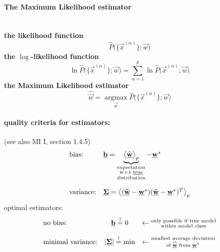 \paragraph{The Maximum Likelihood estimator}\mbox{}\\
\textbf{the likelihood function}\\
\begin{equation*}
        \widehat{P}\big(\big\{\vec{x}^{(\alpha)}\big\}; \vec{w}\big)
\end{equation*}
\textbf{the $\log$-likelihood function}
$$
\ln \widehat{P}\big(\big\{\vec{x}^{(\alpha)}\big\};\vec{w}\big)
= \sum\limits_{\alpha = 1}^p \ln \widehat{P}
                        \big( \vec{x}^{(\alpha)};\vec{w} \big) 
$$
\textbf{the Maximum Likelihood estimator}\\
\begin{equation*}
        \widehat{\vec{w}} = \underset{\vec{w}}{\operatorname{argmax}}\widehat{P}\big(\big\{\vec{x}^{(\alpha)}\big\}; \vec{w}\big) 
\end{equation*}

\paragraph{quality criteria for estimators:} (see also MI I, section 1.4.5)
\begin{equation}
        \begin{array}{ll}
                \text{bias:} & \vec{b} = \underbrace{ \big< 
                        \widehat{\vec{w}} \big>_p }_{
                        \substack{      \text{expectation} \\
                                        \text{w.r.t \underline{true}} \\
                                        \text{distribution}}
                                }- \vec{w}^* \\\\
                \text{variance:} & \vec{\Sigma} = \big< ( \widehat{\vec{w}}
                        -\vec{w}^*)(\widehat{\vec{w}} - \vec{w}^* )^T \big>_p
        \end{array}
\end{equation}
optimal estimators:
\begin{equation}
        \begin{array}{lcl}
                \text{no bias:} & \vec{b} \eqexcl 0 & \leftarrow
                        \substack{      \text{only possible if true model} \\
                                        \text{within model class} } \\\\
                \text{minimal variance:} & |\vec{\Sigma}| \eqexcl \min
                        & \leftarrow \substack{\text{smallest average 
                            deviation} \\ \text{of } \widehat{\vec{w}} \text{ from }
                                                \vec{w}^*}
        \end{array}
\end{equation}

